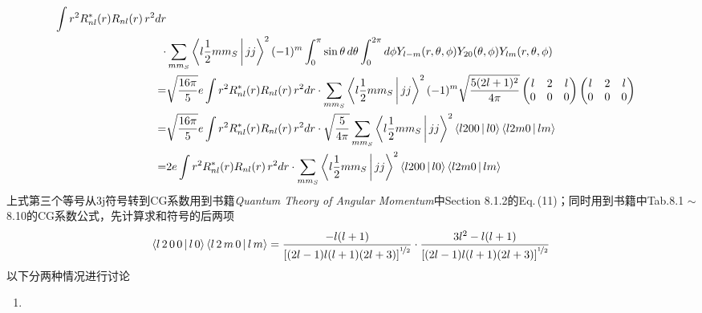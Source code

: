 \begin{exercise}
\begin{equation*}
\begin{aligned}
           \int r^2 R_{nl}^{\ast}(r) R_{nl}(r)\, r^2dr \\
           \cdot
           &\sum_{m m_{S}}  \Braket{l\frac{1}{2}mm_{S} | jj}^2  (-1)^{m}
           \int_{0}^{\pi}\sin{\theta}\, d\theta \int_{0}^{2\pi} d\phi
           Y_{l-m}(r, \theta, \phi) Y_{20}(\theta, \phi) Y_{lm}(r, \theta, \phi) \\
          =&  \sqrt{\frac{16\pi}{5}} e
           \int r^2 R_{nl}^{\ast}(r) R_{nl}(r)\, r^2dr
           \cdot
           \sum_{m m_{S}}  \Braket{l\frac{1}{2}mm_{S} | jj}^2 (-1)^{m}
           \sqrt{\frac{5(2l + 1)^2}{4\pi}}
           \begin{pmatrix}
               l & 2 & l \\
               0 & 0   & 0
           \end{pmatrix}
           \begin{pmatrix}
               l & 2 & l \\
               0 & 0 & 0
           \end{pmatrix} \\
           =&  \sqrt{\frac{16\pi}{5}} e
           \int r^2 R_{nl}^{\ast}(r) R_{nl}(r)\, r^2dr
           \cdot \sqrt{\frac{5}{4\pi}}
           \sum_{m m_{S}}
           \Braket{l\frac{1}{2}mm_{S} | jj}^2
           \Braket{l200 | l0}
           \Braket{l2m0 | lm} \\
           =&  2 e
           \int r^2 R_{nl}^{\ast}(r) R_{nl}(r)\, r^2dr
           \cdot
           \sum_{m m_{S}}
           \Braket{l\frac{1}{2}mm_{S} | jj}^2
           \Braket{l200 | l0}
           \Braket{l2m0 | lm} \\
        \end{aligned}
    \end{equation*}
    上式第三个等号从3j符号转到CG系数用到书籍\textit{Quantum Theory of Angular Momentum}中Section 8.1.2的Eq.\,(11)；同时用到书籍中Tab.8.1 $\sim$  8.10的CG系数公式，先计算求和符号的后两项
    \begin{equation*}
        \Braket{l\, 2\, 0\, 0 | l\, 0}\Braket{l\, 2\, m\, 0 | l\, m} 
        =
        \frac{-l(l+1)}{\left[(2l - 1)l(l+1)(2l+3)\right]^{\nicefrac{1}{2}}}
        \cdot
        \frac{3l^2 - l(l+1)}{\left[(2l - 1)l(l+1)(2l+3)\right]^{\nicefrac{1}{2}}}
    \end{equation*}
    以下分两种情况进行讨论
    \begin{enumerate}
        \item 
    \end{enumerate}
\end{exercise}

